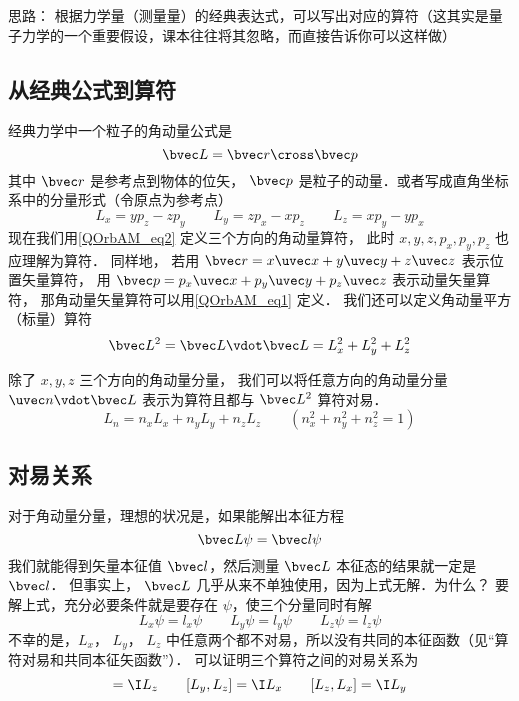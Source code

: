 

思路： 根据力学量（测量量）的经典表达式，可以写出对应的算符（这其实是量子力学的一个重要假设，课本往往将其忽略，而直接告诉你可以这样做）

\subsection{从经典公式到算符}

经典力学中一个粒子的角动量公式是
\begin{equation}\label{QOrbAM_eq1}
\bvec L = \bvec r \cross \bvec p
\end{equation}
其中 $\bvec r$ 是参考点到物体的位矢， $\bvec p$ 是粒子的动量．或者写成直角坐标系中的分量形式（令原点为参考点）
\begin{equation}\label{QOrbAM_eq2}
L_x = y p_z - z p_y \qquad
L_y = z p_x - x p_z \qquad
L_z = x p_y - y p_x
\end{equation}   
现在我们用\autoref{QOrbAM_eq2} 定义三个方向的角动量算符， 此时 $x, y, z, p_x, p_y, p_z$ 也应理解为算符． 同样地， 若用 $\bvec r = x\uvec x + y\uvec y + z\uvec z$ 表示位置矢量算符， 用 $\bvec p = p_x \uvec x + p_y\uvec y + p_z\uvec z$ 表示动量矢量算符， 那角动量矢量算符可以用\autoref{QOrbAM_eq1} 定义． 我们还可以定义角动量平方（标量）算符
\begin{equation}
\bvec L^2 = \bvec L \vdot \bvec L = L_x^2 + L_y^2 + L_z^2
\end{equation}

除了 $x, y, z$ 三个方向的角动量分量， 我们可以将任意方向的角动量分量 $\uvec n \vdot \bvec L$ 表示为算符且都与 $\bvec L^2$ 算符对易．
\begin{equation}
L_n = n_x L_x + n_y L_y + n_z L_z \qquad (n_x^2 + n_y^2 + n_z^2 = 1)
\end{equation}

\subsection{对易关系}

对于角动量分量，理想的状况是，如果能解出本征方程
\begin{equation}
\bvec L \psi  = \bvec l\psi 
\end{equation}
我们就能得到矢量本征值 $\bvec l$，然后测量 $\bvec L$ 本征态的结果就一定是 $\bvec l$． 但事实上， $\bvec L$ 几乎从来不单独使用，因为上式无解．为什么？ 要解上式，充分必要条件就是要存在 $\psi$，使三个分量同时有解
\begin{equation}
L_x \psi  = l_x \psi \qquad
L_y \psi  = l_y \psi \qquad
L_z \psi  = l_z \psi 
\end{equation}   
不幸的是，$L_x$， $L_y$， $L_z$ 中任意两个都不对易，所以没有共同的本征函数（见“算符对易和共同本征矢函数”）． 可以证明三个算符之间的对易关系为
\begin{equation}
[L_x, L_y] = \I L_z \qquad
[L_y, L_z] = \I L_x \qquad
[L_z, L_x] = \I L_y
\end{equation}


